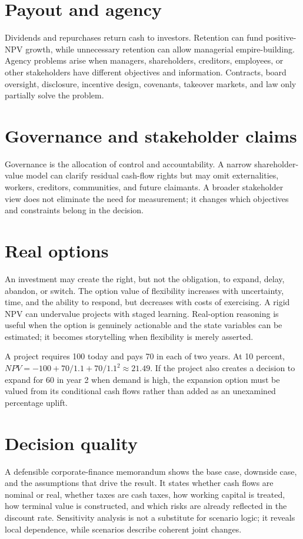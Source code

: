 \section{Payout and agency}
Dividends and repurchases return cash to investors. Retention can fund positive-NPV growth, while unnecessary retention can allow managerial empire-building. Agency problems arise when managers, shareholders, creditors, employees, or other stakeholders have different objectives and information. Contracts, board oversight, disclosure, incentive design, covenants, takeover markets, and law only partially solve the problem.

\section{Governance and stakeholder claims}
Governance is the allocation of control and accountability. A narrow shareholder-value model can clarify residual cash-flow rights but may omit externalities, workers, creditors, communities, and future claimants. A broader stakeholder view does not eliminate the need for measurement; it changes which objectives and constraints belong in the decision.

\section{Real options}
An investment may create the right, but not the obligation, to expand, delay, abandon, or switch. The option value of flexibility increases with uncertainty, time, and the ability to respond, but decreases with costs of exercising. A rigid NPV can undervalue projects with staged learning. Real-option reasoning is useful when the option is genuinely actionable and the state variables can be estimated; it becomes storytelling when flexibility is merely asserted.

\begin{worked}
A project requires 100 today and pays 70 in each of two years. At 10 percent, $NPV=-100+70/1.1+70/1.1^2\approx21.49$. If the project also creates a decision to expand for 60 in year 2 when demand is high, the expansion option must be valued from its conditional cash flows rather than added as an unexamined percentage uplift.
\end{worked}

\section{Decision quality}
A defensible corporate-finance memorandum shows the base case, downside case, and the assumptions that drive the result. It states whether cash flows are nominal or real, whether taxes are cash taxes, how working capital is treated, how terminal value is constructed, and which risks are already reflected in the discount rate. Sensitivity analysis is not a substitute for scenario logic; it reveals local dependence, while scenarios describe coherent joint changes.

